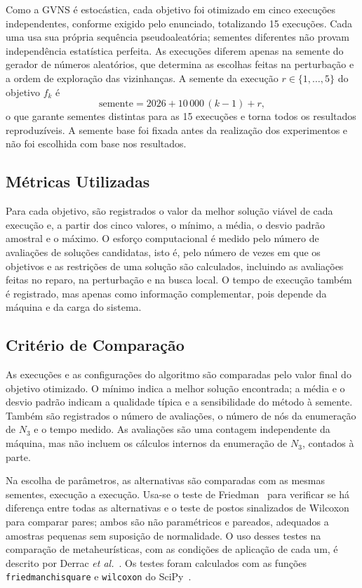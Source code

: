 \documentclass[conference]{IEEEtran}
\begin{document}
Como a GVNS é estocástica, cada objetivo foi otimizado em cinco execuções independentes, conforme exigido pelo enunciado, totalizando 15 execuções. Cada uma usa sua própria sequência pseudoaleatória; sementes diferentes não provam independência estatística perfeita. As execuções diferem apenas na semente do gerador de números aleatórios, que determina as escolhas feitas na perturbação e a ordem de exploração das vizinhanças. A semente da execução $r \in \{1,\ldots,5\}$ do objetivo $f_k$ é
\begin{equation}
\text{semente} = 2026 + 10\,000\,(k-1) + r,
\end{equation}
o que garante sementes distintas para as 15 execuções e torna todos os resultados reproduzíveis. A semente base foi fixada antes da realização dos experimentos e não foi escolhida com base nos resultados.

\subsection{Métricas Utilizadas}

Para cada objetivo, são registrados o valor da melhor solução viável de cada execução e, a partir dos cinco valores, o mínimo, a média, o desvio padrão amostral e o máximo. O esforço computacional é medido pelo número de avaliações de soluções candidatas, isto é, pelo número de vezes em que os objetivos e as restrições de uma solução são calculados, incluindo as avaliações feitas no reparo, na perturbação e na busca local. O tempo de execução também é registrado, mas apenas como informação complementar, pois depende da máquina e da carga do sistema.

\subsection{Critério de Comparação}

As execuções e as configurações do algoritmo são comparadas pelo valor final do objetivo otimizado. O mínimo indica a melhor solução encontrada; a média e o desvio padrão indicam a qualidade típica e a sensibilidade do método à semente. Também são registrados o número de avaliações, o número de nós da enumeração de $N_3$ e o tempo medido. As avaliações são uma contagem independente da máquina, mas não incluem os cálculos internos da enumeração de $N_3$, contados à parte.

Na escolha de parâmetros, as alternativas são comparadas com as mesmas sementes, execução a execução. Usa-se o teste de Friedman~\cite{friedman1937} para verificar se há diferença entre todas as alternativas e o teste de postos sinalizados de Wilcoxon~\cite{wilcoxon1945} para comparar pares; ambos são não paramétricos e pareados, adequados a amostras pequenas sem suposição de normalidade. O uso desses testes na comparação de metaheurísticas, com as condições de aplicação de cada um, é descrito por Derrac \textit{et al.}~\cite{derrac2011}. Os testes foram calculados com as funções \texttt{friedmanchisquare} e \texttt{wilcoxon} do SciPy~\cite{scipy2020}.
\end{document}
